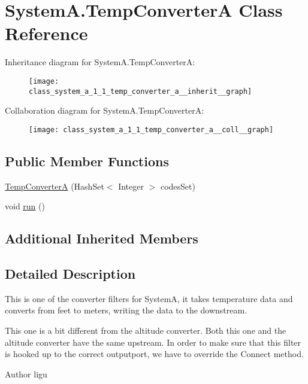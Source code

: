 \hypertarget{class_system_a_1_1_temp_converter_a}{}\section{System\+A.\+Temp\+Converter\+A Class Reference}
\label{class_system_a_1_1_temp_converter_a}


Inheritance diagram for System\+A.\+Temp\+Converter\+A\+:
\nopagebreak
\begin{figure}[H]
\begin{center}
\leavevmode
\texttt{[image: class\_system\_a\_1\_1\_temp\_converter\_a\_\_inherit\_\_graph]}
\end{center}
\end{figure}


Collaboration diagram for System\+A.\+Temp\+Converter\+A\+:
\nopagebreak
\begin{figure}[H]
\begin{center}
\leavevmode
\texttt{[image: class\_system\_a\_1\_1\_temp\_converter\_a\_\_coll\_\_graph]}
\end{center}
\end{figure}
\subsection*{Public Member Functions}
\begin{DoxyCompactItemize}
\item 
\hyperlink{class_system_a_1_1_temp_converter_a_a7db095a2db61839462d24eb08c00679a}{Temp\+Converter\+A} (Hash\+Set$<$ Integer $>$ codes\+Set)
\item 
void \hyperlink{class_system_a_1_1_temp_converter_a_a12be4f2452c1138c98500526f0d151a4}{run} ()
\end{DoxyCompactItemize}
\subsection*{Additional Inherited Members}


\subsection{Detailed Description}
This is one of the converter filters for System\+A, it takes temperature data and converts from feet to meters, writing the data to the downstream.

This one is a bit different from the altitude converter. Both this one and the altitude converter have the same upstream. In order to make sure that this filter is hooked up to the correct outputport, we have to override the Connect method. \begin{DoxyAuthor}{Author}
ligu 
\end{DoxyAuthor}


